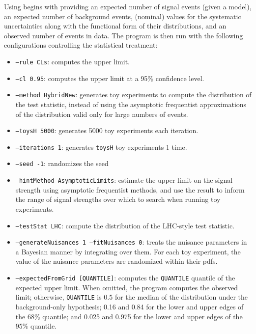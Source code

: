 Using \combine begins with providing an expected number of signal events (given a model), an expected number of background events, (nominal) values for the systematic uncertainties along with the functional form of their distributions, and an observed number of events in data.
The \combine program is then run with the following configurations controlling the statistical treatment:
\begin{itemize}
  \item \texttt{--rule CLs}: computes the \CLs upper limit.
  \item \texttt{--cl 0.95}: computes the upper limit at a 95\% confidence level.
  \item \texttt{--method HybridNew}: generates toy experiments to compute the distribution of the test statistic, instead of using the asymptotic frequentist approximations of the distribution valid only for large numbers of events.
  \item \texttt{--toysH 5000}: generates 5000 toy experiments each iteration.
  \item \texttt{--iterations 1}: generates \texttt{toysH} toy experiments 1 time.
  \item \texttt{--seed -1}: randomizes the seed
  \item \texttt{--hintMethod AsymptoticLimits}: estimate the upper limit on the signal strength using asymptotic frequentist methods, and use the result to inform the range of signal strengths over which to search when running toy experiments.
  \item \texttt{--testStat LHC}: compute the distribution of the LHC-style test statistic.
  \item \texttt{--generateNuisances 1 --fitNuisances 0}: treats the nuisance parameters in a Bayesian manner by integrating over them. For each toy experiment, the value of the nuisance parameters are randomized within their pdfs.
  \item \texttt{--expectedFromGrid [QUANTILE]}: computes the \texttt{QUANTILE} quantile of the expected upper limit. When omitted, the program computes the observed limit; otherwise, \texttt{QUANTILE} is 0.5 for the median of the distribution under the background-only hypothesis; 0.16 and 0.84 for the lower and upper edges of the 68\% quantile; and 0.025 and 0.975 for the lower and upper edges of the 95\% quantile. 
\end{itemize}

